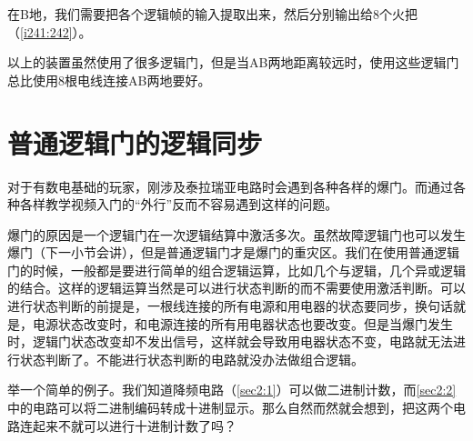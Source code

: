 在B地，我们需要把各个逻辑帧的输入提取出来，然后分别输出给8个火把（\autoref{i241:242}）。

以上的装置虽然使用了很多逻辑门，但是当AB两地距离较远时，使用这些逻辑门总比使用8根电线连接AB两地要好。

\section{普通逻辑门的逻辑同步}
对于有数电基础的玩家，刚涉及泰拉瑞亚电路时会遇到各种各样的爆门。而通过各种各样教学视频入门的“外行”反而不容易遇到这样的问题。

爆门的原因是一个逻辑门在一次逻辑结算中激活多次。虽然故障逻辑门也可以发生爆门（下一小节会讲），但是普通逻辑门才是爆门的重灾区。我们在使用普通逻辑门的时候，一般都是要进行简单的组合逻辑运算，比如几个与逻辑，几个异或逻辑的结合。这样的逻辑运算当然是可以进行状态判断的而不需要使用激活判断。可以进行状态判断的前提是，一根线连接的所有电源和用电器的状态要同步，换句话就是，电源状态改变时，和电源连接的所有用电器状态也要改变。但是当爆门发生时，逻辑门状态改变却不发出信号，这样就会导致用电器状态不变，电路就无法进行状态判断了。不能进行状态判断的电路就没办法做组合逻辑。

举一个简单的例子。我们知道降频电路（\autoref{sec2:1}）可以做二进制计数，而\autoref{sec2:2}中的电路可以将二进制编码转成十进制显示。那么自然而然就会想到，把这两个电路连起来不就可以进行十进制计数了吗？

